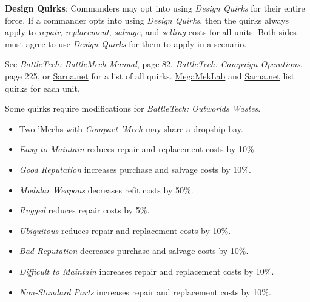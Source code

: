 \item {\bfseries Design Quirks}: Commanders may opt into using \emph{Design Quirks} for their entire force.
If a commander opts into using \emph{Design Quirks}, then the quirks always apply to \emph{repair}, \emph{replacement}, \emph{salvage}, and \emph{selling} costs for all units.
Both sides must agree to use \emph{Design Quirks} for them to apply in a scenario.

See \emph{BattleTech: BattleMech Manual}, page 82, \emph{BattleTech: Campaign Operations}, page 225, or \href{https://sarna.net}{Sarna.net} for a list of all quirks.
\href{https://megamek.org}{MegaMekLab} and \href{https://sarna.net}{Sarna.net} list quirks for each unit.

Some quirks require modifications for \emph{BattleTech: Outworlds Wastes}.

\begin{itemize}

\item Two 'Mechs with \emph{Compact 'Mech} may share a dropship bay.

\item \emph{Easy to Maintain} reduces repair and replacement costs by 10\%.

\item \emph{Good Reputation} increases purchase and salvage costs by 10\%.

\item \emph{Modular Weapons} decreases refit costs by 50\%.

\item \emph{Rugged} reduces repair costs by 5\%.

\item \emph{Ubiquitous} reduces repair and replacement costs by 10\%.

\item \emph{Bad Reputation} decreases purchase and salvage costs by 10\%.

\item \emph{Difficult to Maintain} increases repair and replacement costs by 10\%.

\item \emph{Non-Standard Parts} increases repair and replacement costs by 10\%.

\end{itemize}
